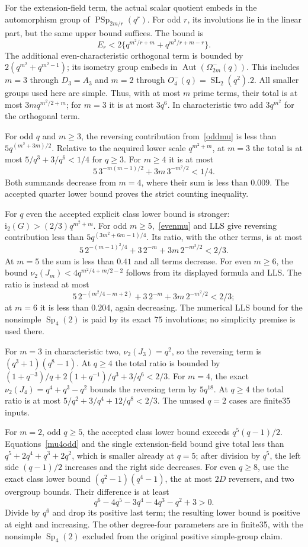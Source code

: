\documentclass[10pt]{article}
\newcommand{\ii}{\mathrm i_2}\newcommand{\nuu}{\nu_2}\newcommand{\F}{\mathbb F}\newcommand{\GL}{\operatorname{GL}}\newcommand{\GU}{\operatorname{GU}}\newcommand{\Sp}{\operatorname{Sp}}\newcommand{\PSp}{\operatorname{PSp}}\newcommand{\PGSp}{\operatorname{PGSp}}\newcommand{\Aut}{\operatorname{Aut}}
\begin{document}
For the extension-field term, the actual scalar quotient embeds in the
automorphism group of $\PSp_{2m/r}(q^r)$. For odd $r$, its involutions lie
in the linear part, but the same upper bound suffices. The bound is
\[
 E_r<2\{q^{m^2/r+m}+q^{m^2/r+m-r}\}.
\]
The additional even-characteristic orthogonal term is bounded by
$2(q^{m^2}+q^{m^2-1})$; its isometry group embeds in
$\Aut(\Omega^-_{2m}(q))$. This includes $m=3$ through $D_3=A_3$ and
$m=2$ through $O^-_4(q)=\operatorname{SL}_2(q^2).2$.
All smaller groups used here are simple. Thus, with at most $m$ prime
terms, their total is at most $3m q^{m^2/2+m}$; for $m=3$ it is at most
$3q^6$. In characteristic two add $3q^{m^2}$ for the orthogonal term.

For odd $q$ and $m\ge3$, the reversing contribution from~\eqref{oddmu}
is less than $5q^{(m^2+3m)/2}$. Relative to the acquired lower scale
$q^{m^2+m}$, at $m=3$ the total is at most
$5/q^3+3/q^6<1/4$ for $q\ge3$. For $m\ge4$ it is at most
\[
 5\,3^{-m(m-1)/2}+3m\,3^{-m^2/2}<1/4.
\]
Both summands decrease from $m=4$, where their sum is less than $0.009$.
The accepted quarter lower bound proves the strict counting inequality.

For $q$ even the accepted explicit class lower bound is stronger:
$\ii(G)>(2/3)q^{m^2+m}$. For odd $m\ge5$,~\eqref{evenmu} and LLS give
reversing contribution less than $5q^{(3m^2+6m-1)/4}$. Its ratio, with the
other terms, is at most
\[
 5\,2^{-(m-1)^2/4}+3\,2^{-m}+3m\,2^{-m^2/2}<2/3.
\]
At $m=5$ the sum is less than $0.41$ and all terms decrease. For even
$m\ge6$, the bound $\nuu(J_m)<4q^{m^2/4+m/2-2}$ follows from its displayed
formula and LLS. The ratio is instead at most
\[
 5\,2^{-(m^2/4-m+2)}+3\,2^{-m}+3m\,2^{-m^2/2}<2/3;
\]
at $m=6$ it is less than $0.204$, again decreasing. The numerical LLS
bound for the nonsimple $\Sp_4(2)$ is paid by its exact $75$ involutions;
no simplicity premise is used there.

For $m=3$ in characteristic two, $\nuu(J_3)=q^2$, so the reversing term
is $(q^3+1)(q^8-1)$. At $q\ge4$ the total ratio is bounded by
$(1+q^{-3})/q+2(1+q^{-1})/q^3+3/q^6<2/3$.
For $m=4$, the exact $\nuu(J_4)=q^4+q^3-q^2$ bounds the reversing term
by $5q^{18}$. At $q\ge4$ the total ratio is at most
$5/q^2+3/q^4+12/q^8<2/3$. The unused $q=2$ cases are finite35 inputs.

For $m=2$, odd $q\ge5$, the accepted class lower bound exceeds
$q^5(q-1)/2$. Equations~\eqref{mu4odd} and the single extension-field
bound give total less than
$q^5+2q^4+q^3+2q^2$, which is smaller already at $q=5$; after division by
$q^5$, the left side $(q-1)/2$ increases and the right side decreases.
For even $q\ge8$, use the exact class lower bound
$(q^2-1)(q^4-1)$, the at most $2D$ reversers, and two overgroup bounds.
Their difference is at least
\[
 q^6-4q^5-3q^4-4q^3-q^2+3>0.
\]
Divide by $q^6$ and drop its positive last term; the resulting lower bound
is positive at eight and increasing. The other degree-four parameters are
in finite35, with the nonsimple $\Sp_4(2)$ excluded from the original
positive simple-group claim.
\end{document}
